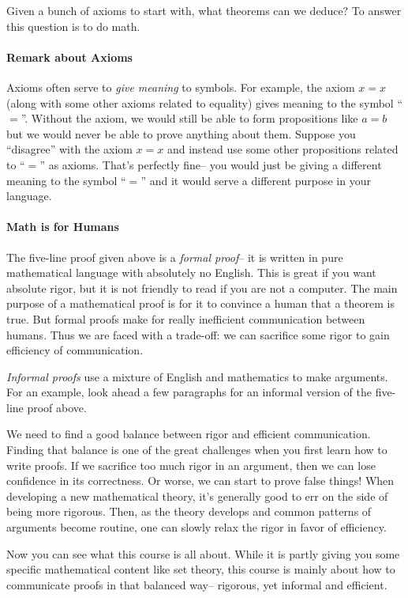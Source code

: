 \documentclass[12pt]{article}
\newcounter{theorem}
\begin{document}
Given a bunch of axioms to start with, what theorems can we deduce?
To answer this question is to do math.

\paragraph{Remark about Axioms}
Axioms often serve to \emph{give meaning} to symbols.
For example, the axiom $x=x$ (along with some other axioms related to equality)
gives meaning to the symbol ``$=$''.
Without the axiom, we would still be able to form propositions like $a=b$ but we would never be able to
prove anything about them.
Suppose you ``disagree'' with the axiom $x=x$ and instead use some other propositions related to ``$=$'' as axioms.
That's perfectly fine-- you would just be giving a different meaning to the symbol ``$=$'' and it would serve a different purpose in your language.

\paragraph{Math is for Humans}
The five-line proof given above is a \emph{formal proof}-- it is written in pure mathematical language
with absolutely no English.
This is great if you want absolute rigor, but
it is not friendly to read if you are not a computer.
The main purpose of a mathematical proof is for it to convince a human that a theorem is true.
But formal proofs make for really inefficient communication between humans.
Thus we are faced with a trade-off: 
we can sacrifice some rigor to gain efficiency of communication.

\emph{Informal proofs} use a mixture of English and mathematics to make arguments.
For an example, look ahead a few paragraphs for an informal version of the five-line proof above.

We need to find a good balance between rigor and efficient communication.
Finding that balance is one of the great challenges when you first learn how to write proofs.
If we sacrifice too much rigor in an argument, then we can lose confidence in its correctness.
Or worse, we can start to prove false things!
When developing a new mathematical theory, it's generally good to err on the side of being more rigorous.
Then, as the theory develops and common patterns of arguments become routine,
one can slowly relax the rigor in favor of efficiency.

Now you can see what this course is all about.
While it is partly giving you some specific mathematical content like set theory,
this course is mainly about how to communicate proofs in that balanced way-- rigorous, yet informal and efficient.
\end{document}
